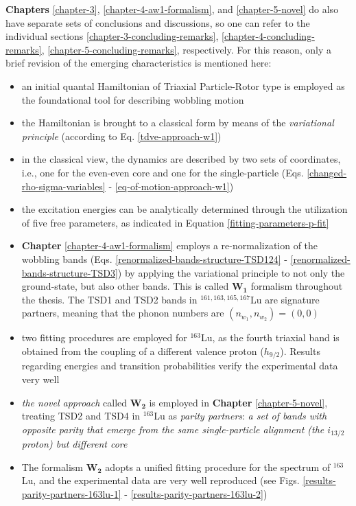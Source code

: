 \textbf{Chapters} \ref{chapter-3}, \ref{chapter-4-aw1-formalism}, and \ref{chapter-5-novel} do also have separate sets of conclusions and discussions, so one can refer to the individual sections \ref{chapter-3-concluding-remarks}, \ref{chapter-4-concluding-remarks}, \ref{chapter-5-concluding-remarks}, respectively. For this reason, only a brief revision of the emerging characteristics is mentioned here:
\begin{itemize}
    \item an initial quantal Hamiltonian of Triaxial Particle-Rotor type is employed as the foundational tool for describing wobbling motion%
    \item the Hamiltonian is brought to a classical form by means of the \emph{variational principle} (according to Eq. \eqref{tdve-approach-w1})
    \item in the classical view, the dynamics are described by two sets of coordinates, i.e., one for the even-even core and one for the single-particle (Eqs. \eqref{changed-rho-sigma-variables} - \eqref{eq-of-motion-approach-w1})
    \item the excitation energies can be analytically determined through the utilization of five free parameters, as indicated in Equation \eqref{fitting-parameters-p-fit}
    \item \textbf{Chapter} \ref{chapter-4-aw1-formalism} employs a re-normalization of the wobbling bands (Eqs. \eqref{renormalized-bands-structure-TSD124} - \eqref{renormalized-bands-structure-TSD3}) by applying the variational principle to not only the ground-state, but also other bands. This is called $\mathbf{W_1}$ formalism throughout the thesis. The TSD1 and TSD2 bands in $^{161,163,165,167}$Lu are signature partners, meaning that the phonon numbers are $(n_{w_1},n_{w_2})=(0,0)$
    \item two fitting procedures are employed for $^{163}$Lu, as the fourth triaxial band is obtained from the coupling of a different valence proton ($h_{9/2}$). Results regarding energies and transition probabilities verify the experimental data very well
    \item \emph{the novel approach} called $\mathbf{W_2}$ is employed in \textbf{Chapter} \ref{chapter-5-novel}, treating TSD2 and TSD4 in $^{163}$Lu as \emph{parity partners}: \emph{a set of bands with opposite parity that emerge from the same single-particle alignment (the $i_{13/2}$ proton) but different core}
    \item The formalism $\mathbf{W_2}$ adopts a unified fitting procedure for the spectrum of $^{163}$Lu, and the experimental data are very well reproduced (see Figs. \ref{results-parity-partners-163lu-1} - \ref{results-parity-partners-163lu-2})

\end{itemize}
